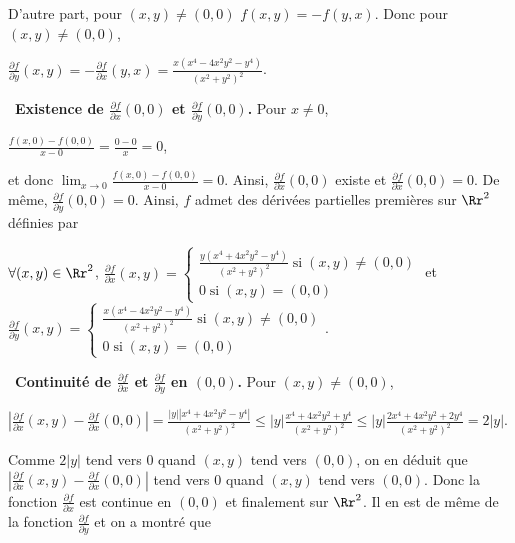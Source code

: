 {{D'autre part, pour $(x,y)\neq(0,0)$ $f(x,y)=-f(y,x)$. Donc pour $(x,y)\neq(0,0)$,

\begin{center}
$ \frac{\partial f}{\partial y}(x,y)=- \frac{\partial f}{\partial x}(y,x)= \frac{x(x^4-4x^2y^2-y^4)}{(x^2+y^2)^2}$.
\end{center}

\textbullet~\textbf{Existence de $ \frac{\partial f}{\partial x}(0,0)$ et $ \frac{\partial f}{\partial y}(0,0)$.} Pour $x\neq0$,

\begin{center}
$ \frac{f(x,0)-f(0,0)}{x-0}= \frac{0-0}{x}=0$,
\end{center}

et donc $\lim_{x \rightarrow 0} \frac{f(x,0)-f(0,0)}{x-0}=0$. Ainsi, $ \frac{\partial f}{\partial x}(0,0)$ existe et $ \frac{\partial f}{\partial x}(0,0)=0$. De même, $ \frac{\partial f}{\partial y}(0,0)=0$. Ainsi, $f$ admet des dérivées partielles premières sur $\Rr^2$ définies par

\begin{center}
$\forall(x,y)\in\Rr^2$, $ \frac{\partial f}{\partial x}(x,y)=\left\{
\begin{array}{l}
 \frac{y(x^4+4x^2y^2-y^4)}{(x^2+y^2)^2}\;\text{si}\;(x,y)\neq(0,0)\\
0\;\text{si}\;(x,y)=(0,0)
\end{array}
\right.$ et $ \frac{\partial f}{\partial y}(x,y)=\left\{
\begin{array}{l}
 \frac{x(x^4-4x^2y^2-y^4)}{(x^2+y^2)^2}\;\text{si}\;(x,y)\neq(0,0)\\
0\;\text{si}\;(x,y)=(0,0)
\end{array}
\right.$.
\end{center}

\textbullet~\textbf{Continuité de $ \frac{\partial f}{\partial x}$ et $ \frac{\partial f}{\partial y}$ en $(0,0)$.} Pour $(x,y)\neq(0,0)$,

\begin{center}
$\left| \frac{\partial f}{\partial x}(x,y)- \frac{\partial f}{\partial x}(0,0)\right|= \frac{|y||x^4+4x^2y^2-y^4|}{(x^2+y^2)^2}\leqslant|y| \frac{x^4+4x^2y^2+y^4}{(x^2+y^2)^2}\leqslant|y| \frac{2x^4+4x^2y^2+2y^4}{(x^2+y^2)^2}=2|y|$.
\end{center}

Comme $2|y|$ tend vers $0$ quand $(x,y)$ tend vers $(0,0)$, on en déduit que $\left| \frac{\partial f}{\partial x}(x,y)- \frac{\partial f}{\partial x}(0,0)\right|$ tend vers $0$ quand $(x,y)$ tend vers $(0,0)$. Donc la fonction $ \frac{\partial f}{\partial x}$ est continue en $(0,0)$ et finalement sur $\Rr^2$. Il en est de même de la fonction $ \frac{\partial f}{\partial y}$ et on a montré que

\begin{center}
\end{center}
}
}
